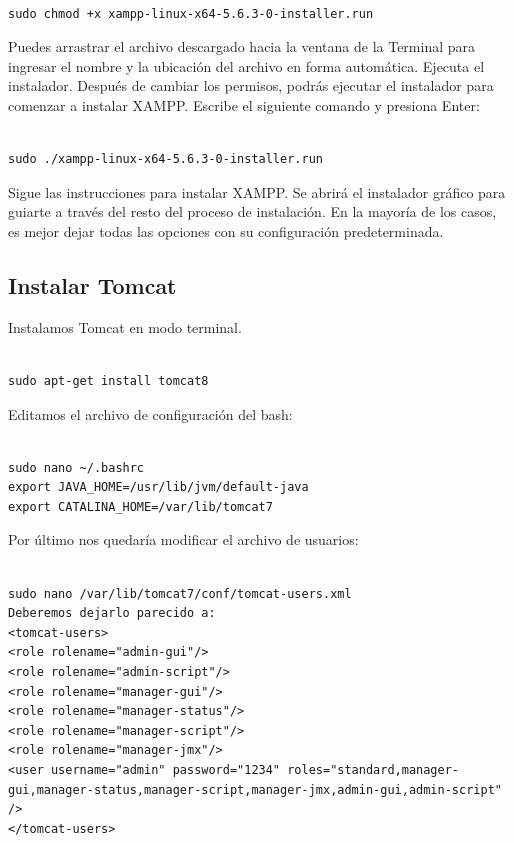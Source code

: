 \begin{lstlisting}

sudo chmod +x xampp-linux-x64-5.6.3-0-installer.run
\end{lstlisting}

Puedes arrastrar el archivo descargado hacia la ventana de la Terminal para ingresar el nombre y la ubicación del archivo en forma automática.
Ejecuta el instalador. Después de cambiar los permisos, podrás ejecutar el instalador para comenzar a instalar XAMPP. Escribe el siguiente comando y presiona Enter: 

\begin{lstlisting}

sudo ./xampp-linux-x64-5.6.3-0-installer.run
\end{lstlisting}

Sigue las instrucciones para instalar XAMPP. Se abrirá el instalador gráfico para guiarte a través del resto del proceso de instalación. En la mayoría de los casos, es mejor dejar todas las opciones con su configuración predeterminada.
\subsection{Instalar Tomcat}
Instalamos Tomcat  en modo terminal.

\begin{lstlisting}

sudo apt-get install tomcat8
\end{lstlisting}

Editamos el archivo de configuración del bash:

\begin{lstlisting}

sudo nano ~/.bashrc
export JAVA_HOME=/usr/lib/jvm/default-java
export CATALINA_HOME=/var/lib/tomcat7
\end{lstlisting}

Por último nos quedaría modificar el archivo de usuarios:

\begin{lstlisting}

sudo nano /var/lib/tomcat7/conf/tomcat-users.xml
Deberemos dejarlo parecido a:
<tomcat-users>
<role rolename="admin-gui"/>
<role rolename="admin-script"/>
<role rolename="manager-gui"/>
<role rolename="manager-status"/>
<role rolename="manager-script"/>
<role rolename="manager-jmx"/>
<user username="admin" password="1234" roles="standard,manager-gui,manager-status,manager-script,manager-jmx,admin-gui,admin-script" />
</tomcat-users>
\end{lstlisting}

